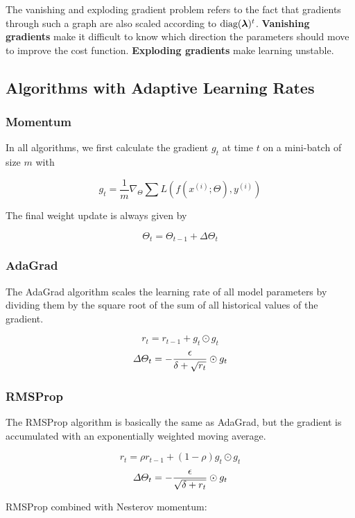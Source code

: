 \begin{multicols}{2}
	The vanishing and exploding gradient problem refers to the fact that gradients through such a graph are also scaled according to $\diag(\bol{\lambda})^t$.
	\textbf{Vanishing gradients }make it difficult to know which direction the parameters should move to improve the cost function.
	\textbf{Exploding gradients} make learning unstable.

	\subsection{Algorithms with Adaptive Learning Rates }
		\subsubsection{Momentum}
		In all algorithms, we first calculate the gradient $g_t$ at time $t$ on a mini-batch of size $m$ with

		\[ g_{t} = \frac{1}{m} \nabla_{\Theta} \sum L(f(x^{(i)};\Theta),y^{(i)})    \]

		The final weight update is always given by

		\[ \Theta_{t} = \Theta_{t-1} + \Delta\Theta_{t} \]


		\subsubsection{AdaGrad}
		The AdaGrad algorithm scales the learning rate of all model parameters by dividing them by the square root of the sum of all historical values of the gradient.

		\[ r_{t} = r_{t-1} + g_{t}\odot g_{t} \]
		\[ \Delta\Theta_{t} = - \frac{{\epsilon}}{\delta + \sqrt{r_{t}}} \odot g_{t} \]

		\subsubsection{RMSProp}
		The RMSProp algorithm is basically the same as AdaGrad, but the gradient is accumulated with an exponentially weighted moving average.

		\[ r_{t} = \rho r_{t-1} + (1- \rho) g_{t}\odot g_{t}\]
		\[ \Delta\Theta_{t} = - \frac{{\epsilon}}{\sqrt{\delta + r_{t}}} \odot g_{t} \]

		RMSProp combined with Nesterov momentum:


\end{multicols}
